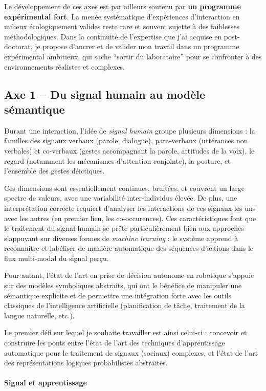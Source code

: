 \documentclass[a4paper]{article}
\begin{document}
Le développement de ces axes est par ailleurs soutenu par \textbf{un programme
expérimental fort}. La menée systématique d'expériences d'interaction en milieux
écologiquement valides reste rare et souvent sujette à des faiblesses
méthodologiques.  Dans la continuité de l'expertise que j'ai acquise en
post-doctorat, je propose d'ancrer et de valider mon travail dans un programme
expérimental ambitieux, qui sache ``sortir du laboratoire'' pour se confronter à
des environnements réalistes et complexes.

\subsection*{Axe 1 -- Du signal humain au modèle sémantique}

Durant une interaction, l'idée de \emph{signal humain} groupe plusieurs
dimensions : la familles des signaux verbaux (parole, dialogue), para-verbaux
(uttérances non verbales) et co-verbaux (gestes accompagnant la parole,
attitudes de la voix), le regard (notamment les mécanismes d'attention
conjointe), la posture, et l'ensemble des gestes déictiques.

Ces dimensions sont essentiellement continues, bruitées, et couvrent un large
spectre de valeurs, avec une variabilité inter-individus élevée. De plus, une
interprétation correcte requiert d'analyser les interactions de ces signaux les
uns avec les autres (en premier lieu, les co-occurences).  Ces caractéristiques
font que le traitement du signal humain se prête particulièrement bien aux
approches s'appuyant sur diverses formes de \emph{machine learning} : le système
apprend à reconnaitre et labéliser de manière automatique des séquences
d'actions dans le flux multi-modal du signal perçu.

Pour autant, l'état de l'art en prise de décision autonome en robotique
s'appuie sur des modèles symboliques abstraits, qui ont le bénéfice de manipuler
une sémantique explicite et de permettre une intégration forte avec les outils
classiques de l'intelligence artificielle (planification de tâche, traitement de
la langue naturelle, etc.).

Le premier défi sur lequel je souhaite travailler est ainsi celui-ci :
concevoir et construire les ponts entre l'état de l'art des techniques d'apprentissage
automatique pour le traitement de signaux (sociaux) complexes, et l'état de
l'art des représentations logiques probabilistes abstraites.

\paragraph{Signal et apprentissage}
\end{document}
